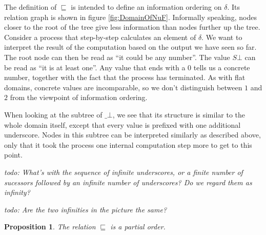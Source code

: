 \documentclass[a4paper]{article}
\newcommand{\todo}[1]{\bigskip \noindent \emph{todo: #1}}
\newtheorem{thmPONuFisPartial}[defNuF]{Proposition}
\begin{document}
The definition of $\sqsubseteq$ is intended to define an information ordering on
$\delta$.  Its relation graph is shown in figure \ref{fig:DomainOfNuF}.
Informally speaking, nodes closer to the root of the tree give less information
than nodes further up the tree.  Consider a process that step-by-step calculates
an element of $\delta$.  We want to interpret the result of the computation
based on the output we have seen so far.  The root node can then be read as ``it
could be any number''.  The value $S\bot$ can be read as ``it is at least one''.
Any value that ends with a $0$ tells us a concrete number, together with the
fact that the process has terminated.  As with flat domains, concrete values are
incomparable, so we don't distinguish between $1$ and $2$ from the viewpoint of
information ordering.

When looking at the subtree of $\_\bot$, we see that its structure is similar
to the whole domain itself, except that every value is prefixed with one additional
underscore.  Nodes in this subtree can be interpreted similarly as described
above, only that it took the process one internal computation step more to
get to this point.

\todo{What's with the sequence of infinite underscores, or a finite number of
sucessors followed by an infinite number of underscores?  Do we regard them as
infinity?}

\todo{Are the two infinities in the picture the same?}

\begin{thmPONuFisPartial}

The relation $\sqsubseteq$ is a partial order.

\end{thmPONuFisPartial}
\end{document}
